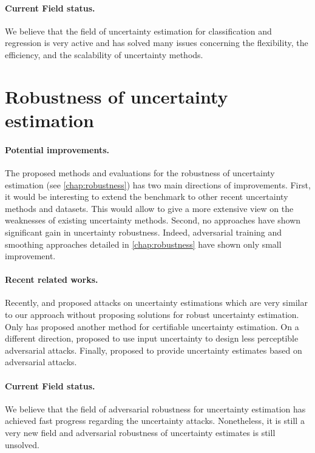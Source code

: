\paragraph{Current Field status.} We believe that the field of uncertainty estimation for classification and regression is very active and has solved many issues concerning the flexibility, the efficiency, and the scalability of uncertainty methods.

\section{Robustness of uncertainty estimation} 

\paragraph{Potential improvements.} The proposed methods and evaluations for the robustness of uncertainty estimation (see \cref{chap:robustness}) has two main directions of improvements. First, it would be interesting to extend the benchmark to other recent uncertainty methods and datasets. This would allow to give a more extensive view on the weaknesses of existing uncertainty methods. Second, no approaches have shown significant gain in uncertainty robustness. Indeed, adversarial training and smoothing approaches detailed in \cref{chap:robustness} have shown only small improvement.

\paragraph{Recent related works.} Recently, \cite{galil2021disrupting} and \cite{huimin2022attackingOOD} proposed attacks on uncertainty estimations which are very similar to our approach without proposing solutions for robust uncertainty estimation. Only \cite{meinke2021provably} has proposed another method for certifiable uncertainty estimation. On a different direction, \cite{dia2021localizeduncertainty} proposed to use input uncertainty to design less perceptible adversarial attacks. Finally, \cite{alarab2021attackucertainty} proposed to provide uncertainty estimates based on adversarial attacks.

\paragraph{Current Field status.} We believe that the field of adversarial robustness for uncertainty estimation has achieved fast progress regarding the uncertainty attacks. Nonetheless, it is still a very new field and adversarial robustness of uncertainty estimates is still unsolved. 

